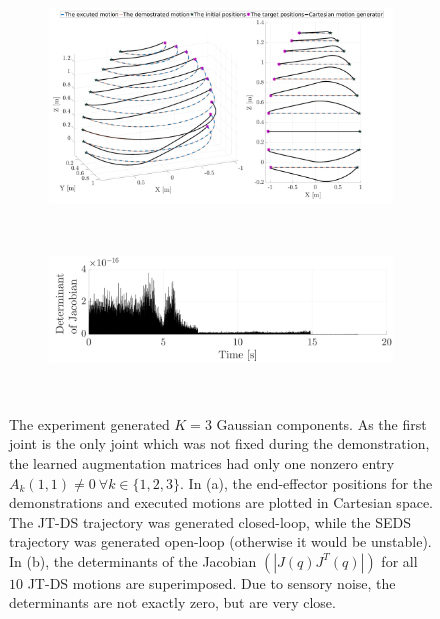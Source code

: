 \documentclass[letterpaper, 10 pt, conference,fleqn]{ieeeconf}
\begin{document}
\begin{figure}[t]
	\begin{subfigure}[t]{\linewidth}
		\includegraphics[width=\linewidth]{Pic/cropped_Sing_1.pdf}
		\caption{ }
		\label{fig:Sin}
	\end{subfigure}\\
	\begin{subfigure}[t]{\linewidth}
		\includegraphics[width=\linewidth]{Pic/cropped_Sing_2.pdf}
		\caption{ }
		\label{fig:Det}
	\end{subfigure}\\
	\caption{The experiment generated $K=3$ Gaussian components. As the first joint is the only joint which was not fixed during the demonstration, the learned augmentation matrices had only one nonzero entry $A_k(1,1)\neq0~\forall k\in \{1, 2, 3\} $.  In (a), the end-effector positions for the demonstrations and executed motions are plotted in Cartesian space. The JT-DS trajectory was generated closed-loop, while the SEDS trajectory was generated open-loop (otherwise it would be unstable). In (b), the determinants of the Jacobian $(|J(q)J^T(q)|)$ for all $10$ JT-DS motions are superimposed. Due to sensory noise, the determinants are not exactly zero, but are very close.  }
	\vspace{-10pt}
\end{figure}


\footnotesize
\appendices
\end{document}
